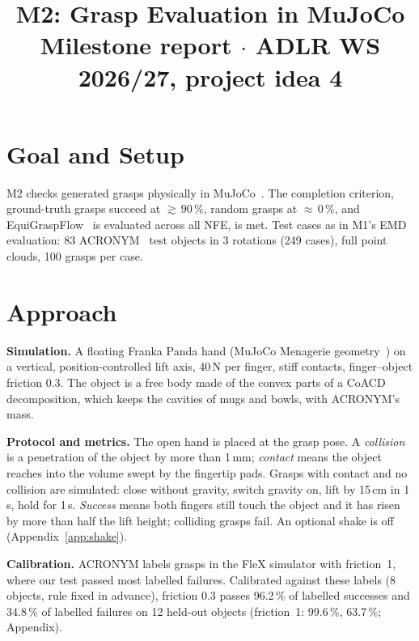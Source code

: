 \documentclass[conference]{IEEEtran}
\begin{document}
\title{M2: Grasp Evaluation in MuJoCo\\[0.3em]
  {\normalsize Milestone report $\cdot$ ADLR WS 2026/27, project idea 4}}

\author{
  \and
}

\maketitle

\section{Goal and Setup}

M2 checks generated grasps physically in MuJoCo~\cite{todorov2012mujoco}. The completion criterion,
ground-truth grasps succeed at ${\gtrsim}\,90\,\%$, random grasps at ${\approx}\,0\,\%$, and
EquiGraspFlow~\cite{lim2024equigraspflow} is evaluated across all NFE, is met. Test cases as in M1's EMD
evaluation: 83 ACRONYM~\cite{eppner2021acronym} test objects in 3 rotations (249 cases), full point clouds,
100 grasps per case.

\section{Approach}

\textbf{Simulation.} A floating Franka Panda hand (MuJoCo Menagerie
geometry~\cite{zakka2022menagerie}) on a vertical, position-controlled lift axis, 40\,N per finger,
stiff contacts, finger--object friction 0.3. The object is a free body made of the convex parts of a
CoACD~\cite{wei2022coacd} decomposition, which keeps the cavities of mugs and bowls, with ACRONYM's mass.

\textbf{Protocol and metrics.} The open hand is placed at the grasp pose. A \emph{collision} is a
penetration of the object by more than 1\,mm; \emph{contact} means the object reaches into the volume
swept by the fingertip pads. Grasps with contact and no collision are simulated: close without gravity,
switch gravity on, lift by 15\,cm in 1\,s, hold for 1\,s. \emph{Success} means both fingers still touch
the object and it has risen by more than half the lift height; colliding grasps fail. An optional shake
is off (Appendix~\ref{app:shake}).

\textbf{Calibration.} ACRONYM labels grasps in the FleX simulator with friction~1, where our test passed
most labelled failures. Calibrated against these labels (8 objects, rule fixed in advance), friction 0.3
passes 96.2\,\% of labelled successes and 34.8\,\% of labelled failures on 12 held-out objects
(friction~1: 99.6\,\%, 63.7\,\%; Appendix).
\end{document}
